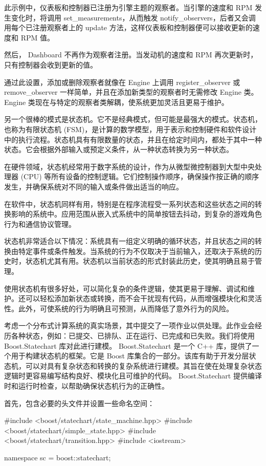 此示例中，仪表板和控制器已注册为引擎主题的观察者。当引擎的速度和 RPM 发生变化时，将调用 set\_measurements，从而触发 notify\_observers，后者又会调用每个已注册观察者上的 update 方法，这样仪表板和控制器便可以接收更新的速度和 RPM 值。

然后， Dashboard 不再作为观察者注册。当发动机的速度和 RPM 再次更新时，只有控制器会收到更新的值。

通过此设置，添加或删除观察者就像在 Engine 上调用 register\_observer 或 remove\_observer 一样简单，并且在添加新类型的观察者时无需修改 Engine 类。Engine 类现在与特定的观察者类解耦，使系统更加灵活且更易于维护。

另一个很棒的模式是状态机。它不是经典模式，但可能是最强大的模式。状态机，也称为有限状态机 (FSM)，是计算的数学模型，用于表示和控制硬件和软件设计中的执行流程。状态机具有有限数量的状态，并且在给定时间内，都处于其中一种状态。它会根据外部输入或预定义条件，从一种状态转换为另一种状态。

在硬件领域，状态机经常用于数字系统的设计，作为从微型微控制器到大型中央处理器 (CPU) 等所有设备的控制逻辑。它们控制操作顺序，确保操作按正确的顺序发生，并确保系统对不同的输入或条件做出适当的响应。

在软件中，状态机同样有用，特别是在程序流程受一系列状态和这些状态之间的转换影响的系统中。应用范围从嵌入式系统中的简单按钮去抖动，到复杂的游戏角色行为和通信协议管理。

状态机非常适合以下情况：系统具有一组定义明确的循环状态，并且状态之间的转换由特定事件或条件触发。当系统的行为不仅取决于当前输入，还取决于系统的历史时，状态机尤其有用。状态机以当前状态的形式封装此历史，使其明确且易于管理。

使用状态机有很多好处，可以简化复杂的条件逻辑，使其更易于理解、调试和维护。还可以轻松添加新状态或转换，而不会干扰现有代码，从而增强模块化和灵活性。此外，可使系统的行为明确且可预测，从而降低了意外行为的风险。

考虑一个分布式计算系统的真实场景，其中提交了一项作业以供处理。此作业会经历各种状态，例如：已提交、已排队、正在运行、已完成和已失败。我们将使用 Boost.Statechart 库对此进行建模。 Boost.Statechart 是一个 C++ 库，提供了一个用于构建状态机的框架。它是 Boost 库集合的一部分。该库有助于开发分层状态机，可以对具有复杂状态和转换的复杂系统进行建模。其旨在使在处理复杂状态逻辑时更容易编写结构良好、模块化且可维护的代码。 Boost.Statechart 提供编译时和运行时检查，以帮助确保状态机行为的正确性。

首先，包含必要的头文件并设置一些命名空间：

\begin{cpp}
#include <boost/statechart/state_machine.hpp>
#include <boost/statechart/simple_state.hpp>
#include <boost/statechart/transition.hpp>
#include <iostream>

namespace sc = boost::statechart;
\end{cpp}

